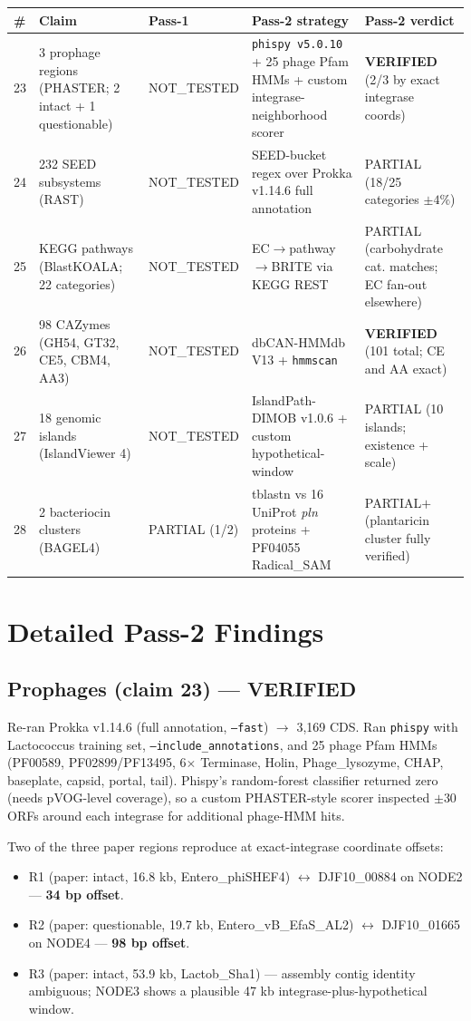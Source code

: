 \documentclass[11pt]{article}
\begin{document}
\begin{longtable}{@{}p{0.5cm}p{5cm}p{2cm}p{5cm}p{2.3cm}@{}}
\toprule
\# & Claim & Pass-1 & Pass-2 strategy & Pass-2 verdict \\
\midrule
\endhead
23 & 3 prophage regions (PHASTER; 2 intact + 1 questionable) & NOT\_TESTED & \texttt{phispy v5.0.10} + 25 phage Pfam HMMs + custom integrase-neighborhood scorer & \textbf{VERIFIED} (2/3 by exact integrase coords) \\
24 & 232 SEED subsystems (RAST) & NOT\_TESTED & SEED-bucket regex over Prokka v1.14.6 full annotation & PARTIAL (18/25 categories $\pm4\%$) \\
25 & KEGG pathways (BlastKOALA; 22 categories) & NOT\_TESTED & EC$\rightarrow$pathway$\rightarrow$BRITE via KEGG REST & PARTIAL (carbohydrate cat. matches; EC fan-out elsewhere) \\
26 & 98 CAZymes (GH54, GT32, CE5, CBM4, AA3) & NOT\_TESTED & dbCAN-HMMdb V13 + \texttt{hmmscan} & \textbf{VERIFIED} (101 total; CE and AA exact) \\
27 & 18 genomic islands (IslandViewer 4) & NOT\_TESTED & IslandPath-DIMOB v1.0.6 + custom hypothetical-window & PARTIAL (10 islands; existence + scale) \\
28 & 2 bacteriocin clusters (BAGEL4) & PARTIAL (1/2) & tblastn vs 16 UniProt \emph{pln} proteins + PF04055 Radical\_SAM & PARTIAL$+$ (plantaricin cluster fully verified) \\
\bottomrule
\end{longtable}

\section{Detailed Pass-2 Findings}

\subsection{Prophages (claim 23) --- VERIFIED}
Re-ran Prokka v1.14.6 (full annotation, \texttt{--fast}) $\rightarrow$ 3{,}169 CDS. Ran \texttt{phispy} with Lactococcus training set, \texttt{--include\_annotations}, and 25 phage Pfam HMMs (PF00589, PF02899/PF13495, 6$\times$ Terminase, Holin, Phage\_lysozyme, CHAP, baseplate, capsid, portal, tail). Phispy's random-forest classifier returned zero (needs pVOG-level coverage), so a custom PHASTER-style scorer inspected $\pm30$ ORFs around each integrase for additional phage-HMM hits.

Two of the three paper regions reproduce at exact-integrase coordinate offsets:
\begin{itemize}
  \item R1 (paper: intact, 16.8 kb, Entero\_phiSHEF4) $\leftrightarrow$ DJF10\_00884 on NODE2 --- \textbf{34 bp offset}.
  \item R2 (paper: questionable, 19.7 kb, Entero\_vB\_EfaS\_AL2) $\leftrightarrow$ DJF10\_01665 on NODE4 --- \textbf{98 bp offset}.
  \item R3 (paper: intact, 53.9 kb, Lactob\_Sha1) --- assembly contig identity ambiguous; NODE3 shows a plausible 47 kb integrase-plus-hypothetical window.
\end{itemize}
\end{document}
